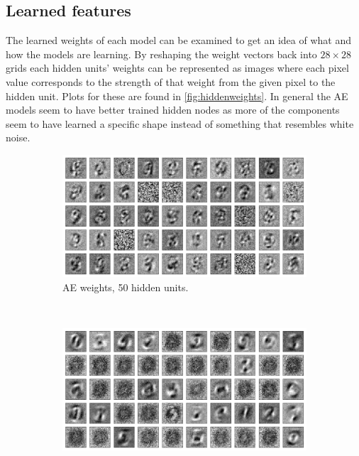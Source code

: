 \documentclass{article}
\begin{document}
\subsection{Learned features}
The learned weights of each model can be examined to get an idea of what and how the models are learning.
By reshaping the weight vectors back into $28 \times 28$ grids
each hidden units' weights can be represented as images
where each pixel value corresponds to the strength of that weight from the given pixel to the hidden unit.
Plots for these are found in \cref{fig:hiddenweights}.
In general the AE models seem to have better trained hidden nodes
as more of the components seem to have learned a specific shape
instead of something that resembles white noise.

\begin{figure}[!ht]
  \centering
  \begin{subfigure}[t]{0.47\textwidth}
    \centering
    \includegraphics[width=\textwidth]{../plots/3_1_2/ae_last_layer_50_components.png}
    \caption{AE weights, 50 hidden units.}
    \label{fig:w50ae}
  \end{subfigure}
  ~
  \addtocounter{subfigure}{1}
  \begin{subfigure}[t]{0.47\textwidth}
    \centering
    \includegraphics[width=\textwidth]{../plots/3_1_2/rbm_last_layer_50_components.png}

\end{subfigure}
\end{figure}
\end{document}
